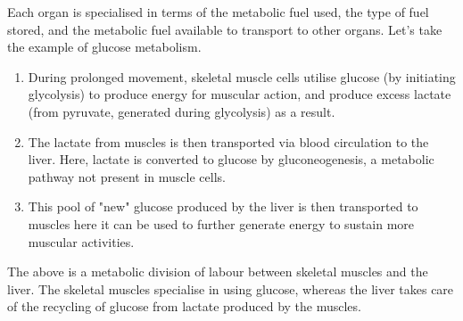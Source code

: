 \documentclass[11pt]{article}
\begin{document}
Each organ is specialised in terms of the metabolic fuel used, the type of fuel stored, and the metabolic fuel available to transport to other organs. Let's take the example of glucose metabolism.
\\[0pt]

\begin{enumerate}
\item During prolonged movement, skeletal muscle cells utilise glucose (by initiating glycolysis) to produce energy for muscular action, and produce excess lactate (from pyruvate, generated during glycolysis) as a result.
\item The lactate from muscles is then transported via blood circulation to the liver. Here, lactate is converted to glucose by gluconeogenesis, a metabolic pathway not present in muscle cells.
\item This pool of "new" glucose produced by the liver is then transported to muscles here it can be used to further generate energy to sustain more muscular activities.
\end{enumerate}

The above is a metabolic division of labour between skeletal muscles and the liver. The skeletal muscles specialise in using glucose, whereas the liver takes care of the recycling of glucose from lactate produced by the muscles.
\end{document}
